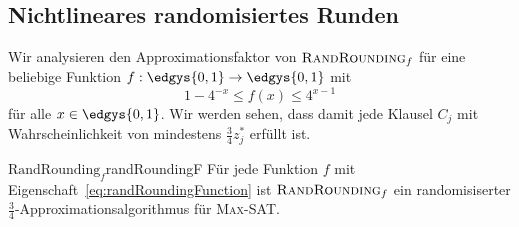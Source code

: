 \documentclass[language=ngerman,algolist]{TemplateLecture}
\begin{document}
\subsection{Nichtlineares randomisiertes Runden}
\begin{algorithm}[h]
    \caption{$\textsc{RandRounding}_f$}\label{alg:RandRoundingF}
    \begin{algorithmic}[1]
         
    \end{algorithmic}
\end{algorithm}

Wir analysieren den Approximationsfaktor von $\textsc{RandRounding}_f$ für eine beliebige Funktion $f: \edgys{0,1} \to \edgys{0,1}$ mit 
\begin{equation}
    1 - 4^{-x} \leq f(x) \leq 4^{x-1} \label{eq:randRoundingFunction}
\end{equation}
für alle $x \in \edgys{0,1}$. Wir werden sehen, dass damit jede Klausel $C_j$ mit Wahrscheinlichkeit von mindestens $\frac{3}{4}z_j^*$ erfüllt ist.

\begin{thm}{$\text{RandRounding}_f$}{randRoundingF}
    Für jede Funktion $f$ mit Eigenschaft~\eqref{eq:randRoundingFunction} ist $\textsc{RandRounding}_f$ ein randomisiserter $\frac{3}{4}$-Approximationsalgorithmus für \textsc{Max-SAT}.
\end{thm}
\end{document}
